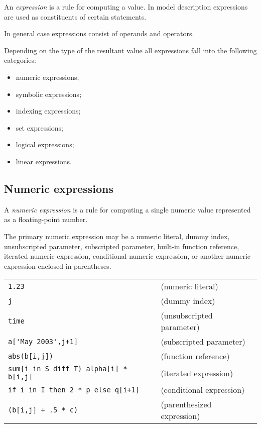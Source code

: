 \documentclass[10pt]{article}
\begin{document}
An {\it expression} is a rule for computing a value. In model
description expressions are used as constituents of certain statements.

In general case expressions consist of operands and operators.

Depending on the type of the resultant value all expressions fall into
the following categories:

\begin{itemize}
\item numeric expressions;
\item symbolic expressions;
\item indexing expressions;
\item set expressions;
\item logical expressions;
\item linear expressions.
\end{itemize}

\subsection{Numeric expressions}

A {\it numeric expression} is a rule for computing a single numeric
value represented as a floating-point number.

The primary numeric expression may be a numeric literal, dummy index,
unsubscripted parameter, subscripted parameter, built-in function
reference, iterated numeric expression, conditional numeric expression,
or another numeric expression enclosed in parentheses.

\medskip


\medskip

\noindent
\begin{tabular}{@{}ll@{}}
\verb|1.23|&(numeric literal)\\
\verb|j|&(dummy index)\\
\verb|time|&(unsubscripted parameter)\\
\verb|a['May 2003',j+1]|&(subscripted parameter)\\
\verb|abs(b[i,j])|&(function reference)\\
\verb|sum{i in S diff T} alpha[i] * b[i,j]|&(iterated expression)\\
\verb|if i in I then 2 * p else q[i+1]|&(conditional expression)\\
\verb|(b[i,j] + .5 * c)|&(parenthesized expression)\\
\end{tabular}
\end{document}
